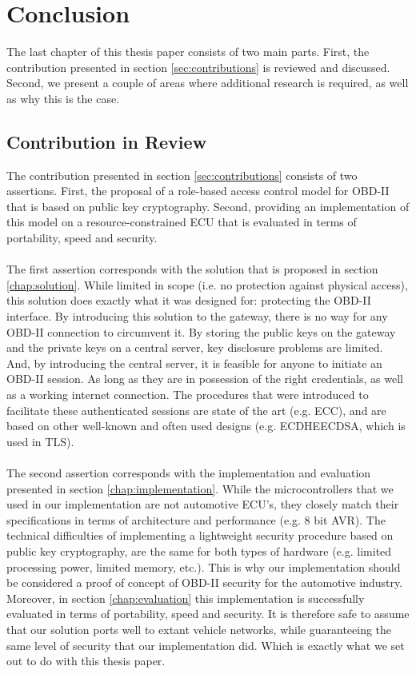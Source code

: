 
\chapter{Conclusion}
\label{chap:conclusion}

The last chapter of this thesis paper consists of two main parts. First, the contribution presented in section \ref{sec:contributions} is reviewed and discussed. Second, we present a couple of areas where additional research is required, as well as why this is the case.

\section{Contribution in Review}
\label{sec:contribution_in_review}

The contribution presented in section \ref{sec:contributions} consists of two assertions. First, the proposal of a role-based access control model for OBD-II that is based on public key cryptography. Second, providing an implementation of this model on a resource-constrained ECU that is evaluated in terms of portability, speed and security. \\ \\ The first assertion corresponds with the solution that is proposed in section \ref{chap:solution}. While limited in scope (i.e. no protection against physical access), this solution does exactly what it was designed for: protecting the OBD-II interface. By introducing this solution to the gateway, there is no way for any OBD-II connection to circumvent it. By storing the public keys on the gateway and the private keys on a central server, key disclosure problems are limited. And, by introducing the central server, it is feasible for anyone to initiate an OBD-II session. As long as they are in possession of the right credentials, as well as a working internet connection. The procedures that were introduced to facilitate these authenticated sessions are state of the art (e.g. ECC), and are based on other well-known and often used designs (e.g. ECDHE\textunderscore ECDSA, which is used in TLS). \\ \\ The second assertion corresponds with the implementation and evaluation presented in section \ref{chap:implementation}. While the microcontrollers that we used in our implementation are not automotive ECU's, they closely match their specifications in terms of architecture and performance (e.g. 8 bit AVR). The technical difficulties of implementing a lightweight security procedure based on public key cryptography, are the same for both types of hardware (e.g. limited processing power, limited memory, etc.). This is why our implementation should be considered a proof of concept of OBD-II security for the automotive industry. Moreover, in section \ref{chap:evaluation} this implementation is successfully evaluated in terms of portability, speed and security. It is therefore safe to assume that our solution ports well to extant vehicle networks, while guaranteeing the same level of security that our implementation did. Which is exactly what we set out to do with this thesis paper.

